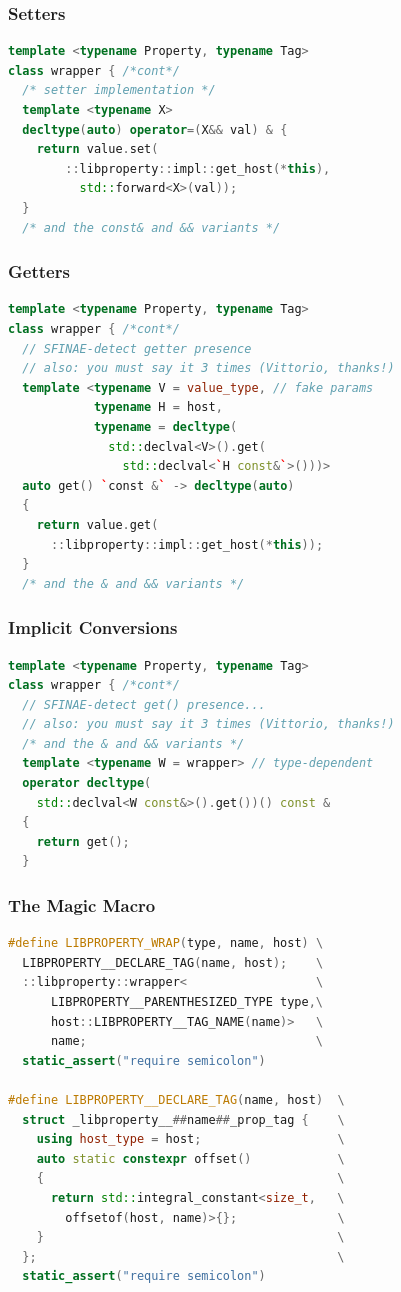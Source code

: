 \documentclass{beamer}
\begin{document}
\begin{frame}[fragile]
\frametitle{Setters}
\begin{lstlisting}[language=cpp]
template <typename Property, typename Tag>
class wrapper { /*cont*/
  /* setter implementation */
  template <typename X>
  decltype(auto) operator=(X&& val) & {
    return value.set(
        ::libproperty::impl::get_host(*this),
          std::forward<X>(val));
  }
  /* and the const& and && variants */
\end{lstlisting}
\end{frame}

\begin{frame}[fragile]
\frametitle{Getters}
\begin{lstlisting}[language=cpp]
template <typename Property, typename Tag>
class wrapper { /*cont*/
  // SFINAE-detect getter presence
  // also: you must say it 3 times (Vittorio, thanks!)
  template <typename V = value_type, // fake params
            typename H = host,
            typename = decltype(
              std::declval<V>().get(
                std::declval<`H const&`>()))>
  auto get() `const &` -> decltype(auto)
  {
    return value.get(
      ::libproperty::impl::get_host(*this));
  }
  /* and the & and && variants */
\end{lstlisting}
\end{frame}


\begin{frame}[fragile]
\frametitle{Implicit Conversions}
\begin{lstlisting}[language=cpp]
template <typename Property, typename Tag>
class wrapper { /*cont*/
  // SFINAE-detect get() presence...
  // also: you must say it 3 times (Vittorio, thanks!)
  /* and the & and && variants */
  template <typename W = wrapper> // type-dependent
  operator decltype(
    std::declval<W const&>().get())() const &
  {
    return get();
  }
\end{lstlisting}
\end{frame}


\begin{frame}[fragile]
\frametitle{The Magic Macro}
\begin{lstlisting}[language=cpp]
#define LIBPROPERTY_WRAP(type, name, host) \
  LIBPROPERTY__DECLARE_TAG(name, host);    \
  ::libproperty::wrapper<                  \
      LIBPROPERTY__PARENTHESIZED_TYPE type,\
      host::LIBPROPERTY__TAG_NAME(name)>   \
      name;                                \
  static_assert("require semicolon")

#define LIBPROPERTY__DECLARE_TAG(name, host)  \
  struct _libproperty__##name##_prop_tag {    \
    using host_type = host;                   \
    auto static constexpr offset()            \
    {                                         \
      return std::integral_constant<size_t,   \
        offsetof(host, name)>{};              \
    }                                         \
  };                                          \
  static_assert("require semicolon")
\end{lstlisting}
\end{frame}
\end{document}
